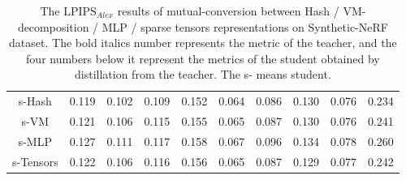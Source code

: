 \documentclass[letterpaper]{article} \usepackage{aaai23}  \usepackage{times}  \usepackage{helvet}  \usepackage{courier}  \usepackage[hyphens]{url}  \usepackage{graphicx} \urlstyle{rm} \def\UrlFont{\rm}  \usepackage{natbib}  \usepackage{caption} \frenchspacing  \setlength{\pdfpagewidth}{8.5in}  \setlength{\pdfpageheight}{11in}  \usepackage{multirow}
\begin{document}
\begin{table*}[t]
{\begin{tabular}{c|ccccccccc}
s-Hash                      & 0.119                   & 0.102                   & 0.109                   & 0.152                   & 0.064                   & 0.086                   & 0.130                   & 0.076                   & 0.234                   \\
s-VM                        & 0.121                   & 0.106                   & 0.115                   & 0.155                   & 0.065                   & 0.087                   & 0.130                   & 0.076                   & 0.241                   \\
s-MLP                       & 0.127                   & 0.111                   & 0.117                   & 0.158                   & 0.067                   & 0.096                   & 0.134                   & 0.078                   & 0.260                   \\
s-Tensors                   & 0.122                   & 0.106                   & 0.116                   & 0.156                   & 0.065                   & 0.087                   & 0.129                   & 0.077                   & 0.242                   \\ \hline
\end{tabular}
}
\caption{ The $\text{LPIPS}_{Alex}$ results of mutual-conversion between Hash / VM-decomposition / MLP /
sparse tensors representations on  Synthetic-NeRF dataset. The bold italics number represents the metric of the teacher, and the four numbers below it represent the metrics of the student obtained by distillation from the teacher. The s- means
student.}
\label{tab-alex-mutual-syn}
\end{table*}
\end{document}
